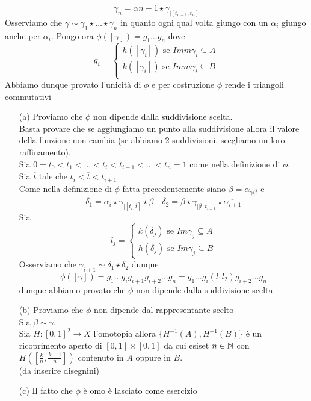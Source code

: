 \begin{thm}
$$ \gamma_n = \alpha{n-1} \star \gamma_{\vert [ t_{n-1}, t_n]}$$
Osserviamo che $\gamma \sim \gamma_1 \star \dots \star \gamma_n $ in quanto ogni qual volta giungo con un $\alpha_i$ giungo anche per $\overline{\alpha}_i$.
Pongo ora $\phi([\gamma])=g_1\dots g_n$ dove 
$$ g_i =\begin{cases} h([\gamma_i]) \text{ se } Imm \gamma_i \subseteq A \\
									k([\gamma_i]) \text{ se } Imm \gamma_i \subseteq B \\
\end{cases}$$
Abbiamo dunque provato l'unicit\`a di $\phi$ e per costruzione $\phi$ rende i triangoli commutativi
\begin{itemize}
\item[(a)]Proviamo che $\phi$ non dipende dalla suddivisione scelta.\\
Basta provare che se aggiungiamo un punto alla suddivisione allora il valore della funzione non cambia (se abbiamo 2 suddivisioni, scegliamo un loro raffinamento).\\
Sia $0=t_0 < t_1< \dots < t_i < t_{i+1} < \dots <t_n=1$ come nella definizione di $\phi$.\\
Sia $\overline{t}$ tale che $t_i< \overline{t} < t_{i+1}$\\
Come nella definizione di $\phi$ fatta precedentemente siano  $\beta= \alpha_{\gamma(\overline{t}}$ e 
$$\delta_1 =\alpha_i \star \gamma_{\vert [ t_i, \overline{t}]} \star \overline{\beta} \quad \delta_2 = \beta \star  \gamma_{\vert [\overline{t}, t_{i+1}} \star \overline{\alpha_{i+1}}$$
Sia 
$$ l_j= \begin{cases}k(\delta_j) \text{ se } Im \gamma_j \subseteq A \\
								h(\delta_j) \text{ se } Im \gamma_j \subseteq B 
\end{cases}$$
Osserviamo che $\gamma_{i+1}\sim \delta_1 \star \delta_2$ dunque
$$ \phi([\gamma])= g_1 \dots g_i g_{i+1}g_{i+2}\dots g_n= g_1\dots g_i ( l_1 l_2) g_{i+2} \dots g_n$$
dunque abbiamo provato che $\phi$ non dipende dalla suddivisione scelta
\item[(b)] Proviamo che $\phi$ non dipende dal rappresentante scelto\\
Sia $\beta \sim \gamma $.\\
Sia $H:[0,1]^2 \to X$ l'omotopia allora $\{ H^{-1}(A), H^{-1}(B)\}$ \`e un ricoprimento aperto di $[0,1]\times [0,1]$ da cui esiset $n \in \mathbb{N}$ con $H \left( \left[ \frac{k}{n}, \frac{k+1}{n} \right]\right) $ contenuto in $A$ oppure in $B$.\\
(da inserire disegnini)
\item[(c)]Il fatto che $\phi$ \`e omo \`e lasciato come esercizio

\end{itemize}
\end{thm}
